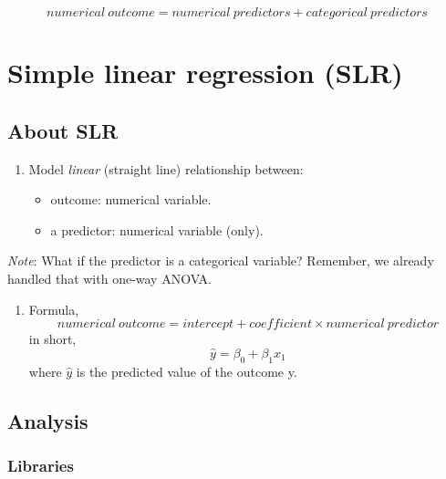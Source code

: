 \documentclass[
]{book}
\providecommand{\tightlist}{%
  \setlength{\itemsep}{0pt}\setlength{\parskip}{0pt}}
\renewenvironment{quote}{\begin{VF}}{\end{VF}}
\begin{document}
\[numerical\ outcome = numerical\ predictors + categorical\ predictors\]

\hypertarget{simple-linear-regression-slr}{%
\section{Simple linear regression (SLR)}\label{simple-linear-regression-slr}}

\hypertarget{about-slr}{%
\subsection{About SLR}\label{about-slr}}

\begin{enumerate}
\def\labelenumi{\arabic{enumi}.}
\item
  Model \emph{linear} (straight line) relationship between:

  \begin{itemize}
  \tightlist
  \item
    outcome: numerical variable.
  \item
    a predictor: numerical variable (only).
  \end{itemize}
\end{enumerate}

\begin{quote}
\emph{Note}: What if the predictor is a categorical variable? Remember, we already handled that with one-way ANOVA.
\end{quote}

\begin{enumerate}
\def\labelenumi{\arabic{enumi}.}
\setcounter{enumi}{1}
\tightlist
\item
  Formula,
  \[numerical\ outcome = intercept + coefficient \times numerical\ predictor\]
  in short,
  \[\hat y = \beta_0 + \beta_1x_1\]
  where \(\hat y\) is the predicted value of the outcome y.
\end{enumerate}

\hypertarget{analysis}{%
\subsection{Analysis}\label{analysis}}

\hypertarget{libraries}{%
\subsubsection{Libraries}\label{libraries}}
\end{document}
